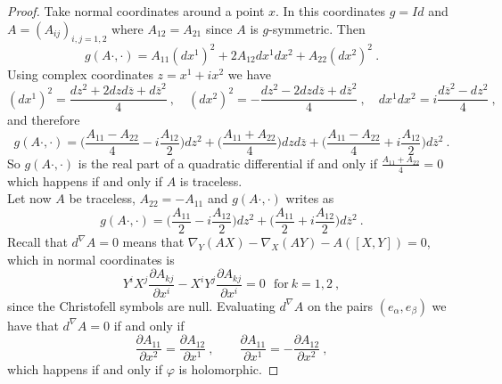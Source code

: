 \begin{proof}
    Take normal coordinates around a point $x$. In this coordinates $g=Id$ and $A = (A_{ij})_{i,j=1,2}$ where $A_{12}=A_{21}$ since $A$ is $g$-symmetric. Then
    \[
        g(A\cdot , \cdot) = A_{11} (dx^1)^2 + 2 A_{12} dx^1 dx^2 + A_{22} (dx^2)^2 \ .
    \]
    Using complex coordinates $z = x^1 + i x^2$ we have
    \[
        (dx^1)^2 = \frac{dz^2 + 2dzd\overline{z} + d\overline{z}^2}{4} \ , \quad (dx^2)^2 = -\frac{dz^2 - 2dzd\overline{z} + d\overline{z}^2}{4} \ , \quad dx^1dx^2 = i \frac{d\overline{z}^2 - dz^2}{4} \ ,
    \]
    and therefore
    \[
        g(A\cdot , \cdot) = \Big( \frac{A_{11} - A_{22}}{4} - i \frac{A_{12}}{2} \Big)dz^2 + \Big( \frac{A_{11} + A_{22}}{4} \Big)dzd\overline{z} +  \Big( \frac{A_{11} - A_{22}}{4} + i \frac{A_{12}}{2} \Big) d\overline{z}^2 \ .
    \]
    So $g(A\cdot , \cdot)$ is the real part of a quadratic differential if and only if $\frac{A_{11} + A_{22}}{4} = 0$ which happens if and only if $A$ is traceless.\\
    Let now $A$ be traceless, $A_{22}=- A_{11}$ and $g(A \cdot, \cdot)$ writes as
    \[
        g(A\cdot , \cdot) = \Big( \frac{A_{11}}{2} - i \frac{A_{12}}{2} \Big)dz^2 +  \Big( \frac{A_{11}}{2} + i \frac{A_{12}}{2} \Big) d\overline{z}^2 \ .
    \]
    Recall that $d^\nabla A = 0$ means that $\nabla_Y (AX) - \nabla_X (AY) - A(\left[X,Y\right]) = 0$, which in normal coordinates is
    \begin{equation}
        Y^i X^j \frac{\partial A_{kj}}{\partial x^i} - X^i Y^j \frac{\partial A_{kj}}{\partial x^i} = 0 \ \ \ \text{for} \ k = 1,2 \ ,
    \end{equation}
    since the Christofell symbols are null. Evaluating $d^\nabla A$ on the pairs $(e_\alpha,e_\beta)$ we have that $d^\nabla A = 0$ if and only if
    \[
        \frac{\partial A_{11}}{ \partial x^2} = \frac{\partial A_{12}}{ \partial x^1} \ , \qquad \frac{\partial A_{11}}{ \partial x^1} = - \frac{\partial A_{12}}{ \partial x^2} \ ,
    \]
    which happens if and only if $\varphi$ is holomorphic.
\end{proof}

